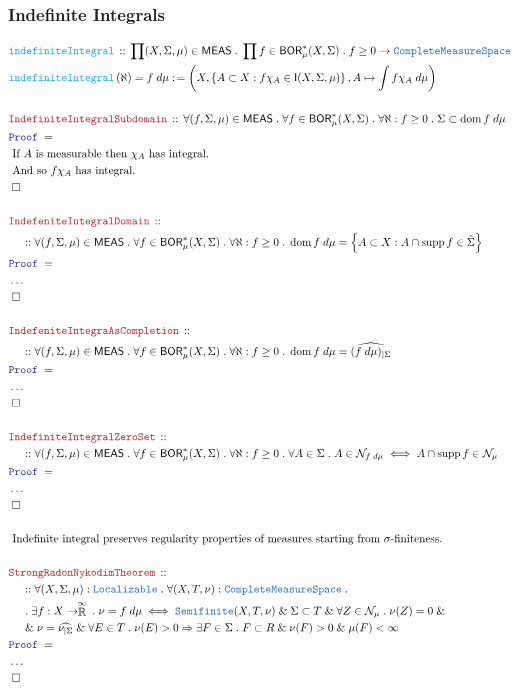 \documentclass[12pt]{scrartcl}
\newcommand{\TYPE}[1]{\textcolor{NavyBlue}{\mathtt{#1}}}
\newcommand{\FUNC}[1]{\textcolor{Cerulean}{\mathtt{#1}}}
\newcommand{\LOGIC}[1]{\textcolor{Blue}{\mathtt{#1}}}
\newcommand{\THM}[1]{\textcolor{Maroon}{\mathtt{#1}}}
\renewcommand{\.}{\; . \;}
\newcommand{\de}{: \kern 0.1pc =}
\newcommand{\Act}[1]{\left( #1 \right)}
\newcommand{\Theorem}[2]{& \THM{#1} \, :: \, #2 \\ & \Proof = \\ }
\newcommand{\DeclareFunc}[2]{& \FUNC{#1} \, :: \, #2 \\}
\newcommand{\DefineNamedFunc}[4]{&  \FUNC{#1}\Act{#2} = #3 \de #4 \\}
\newcommand{\NewLine}{\\ & \kern 1pc}
\newcommand{\Page}[1]{ \begin{align*} #1 \end{align*}   }
\newcommand{\NoProof}{ & \ldots \\ \EndProof}
\renewcommand{\And}{\; \& \;}
\newcommand{\Imply}{\Rightarrow}
\newcommand{\EReals}{\stackrel{\mathclap{\infty}}{\mathbb{R}}}
\DeclareMathOperator*{\supp}{supp}
\newcommand{\QED}{\; \square}
\newcommand{\EndProof}{& \QED \\}
\newcommand{\Proof}{\LOGIC{Proof} \; }
\newcommand{\Explain}[1]{& \text{#1.} \\}
\DeclareMathOperator*{\dom}{dom}
\newcommand{\BOR}{\mathsf{BOR}}
\newcommand{\CMS}{\TYPE{CompleteMeasureSpace}}
\newcommand{\Null}{\mathcal{N}}
\newcommand{\Integrable}{\mathsf{I}}
\newcommand{\Semifinite}{\TYPE{Semifinite}}
\newcommand{\Loc}{\TYPE{Localizable}}
\newcommand{\MEAS}{\mathsf{MEAS}}
\begin{document}
\subsubsection{Indefinite Integrals}
\Page{
	\DeclareFunc{indefiniteIntegral}
	{
		\prod (X,\Sigma,\mu) \in \MEAS \.
		\prod f \in \BOR_\mu^*(X,\Sigma) \. 
		f \ge 0 \to \CMS
	}
	\DefineNamedFunc{indefiniteIntegral}{\aleph}{f \; d \mu}
	{
		\left( X, \left\{ A \subset X  : f\chi_A \in \Integrable(X,\Sigma,\mu) \right\},  
			A \mapsto \int f \chi_A \; d\mu		
		   \right)	
	}
	\\
	\Theorem{IndefiniteIntegralSubdomain}
	{
		\forall (f,\Sigma,\mu) \in \MEAS \.
		\forall f \in 	\BOR_\mu^*(X,\Sigma) \. 
		\forall \aleph : f \ge 0 \.
		\Sigma \subset \dom f\;d\mu
	}
	\Explain{ If $A$ is measurable then $\chi_A$ has integral}
	\Explain{ And so $f\chi_A$ has integral}
	\EndProof
	\\
	\Theorem{IndefeniteIntegralDomain}
	{
		\NewLine ::		
		\forall (f,\Sigma,\mu) \in \MEAS \.
		\forall f \in 	\BOR_\mu^*(X,\Sigma) \. 
		\forall \aleph : f \ge 0 \.
		 \dom f\;d\mu   = \Big\{ A \subset X : A \cap \supp f \in \hat \Sigma  \Big\}
	}
	\NoProof
	\\
	\Theorem{IndefeniteIntegraAsCompletion}
	{
		\NewLine ::		
		\forall (f,\Sigma,\mu) \in \MEAS \.
		\forall f \in 	\BOR_\mu^*(X,\Sigma) \. 
		\forall \aleph : f \ge 0 \.
		\dom f\;d\mu   =  \widehat{ (f\;d\mu)_{|\Sigma}}
	}
	\NoProof
	\\
	\Theorem{IndefiniteIntegralZeroSet}
	{
		\NewLine ::		
		\forall (f,\Sigma,\mu) \in \MEAS \.
		\forall f \in 	\BOR_\mu^*(X,\Sigma) \. 
		\forall \aleph : f \ge 0 \.
		\forall A \in \Sigma \.
		A \in \Null_{f\;d\mu} \iff A \cap \supp f \in \Null_\mu
	}
	\NoProof
	\\
	\Explain{ Indefinite integral preserves regularity properties of measures starting 
		from $\sigma$-finiteness}
	\\
	\Theorem{StrongRadonNykodimTheorem}
	{
		\NewLine ::		
		\forall (X,\Sigma,\mu) : \Loc \.
		\forall (X,T,\nu) : \CMS \. 
		\NewLine \.
		\exists f : X \to \EReals \. \nu = f \; d\mu 
		\iff
		\Semifinite(X,T,\nu)
		\And
		\Sigma \subset T  
		\And
		\forall Z \in \Null_\mu \. \nu(Z) = 0
		\And \NewLine \And
		\nu = \widehat{\nu_{|\Sigma}}
		\And
		\forall E \in T \. \nu(E) > 0 \Imply 
		\exists F \in \Sigma \. F \subset R \And \nu(F) > 0 \And \mu(F) < \infty 
	}
	\NoProof
}
\newpage
\end{document}
